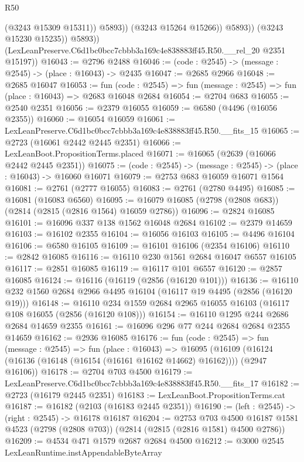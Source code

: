 \begin{lexlean}{R50}
\begin{coremodule}
                        (@3243 @15309 @15311))
                      @5893))
                  (@3243 @15264 @15266))
                @5893))
            (@3243 @15230 @15235))
          @5893))
      (LexLeanPreserve.C6d1bc0bcc7cbbb3a169c4e838883ff45.R50.__rel_20 @2351 @15197))
@16043 := @2796 @2488
@16046 := (code : @2545) -> (message : @2545) -> (place : @16043) -> @2435
@16047 := @2685 @2966
@16048 := @2685 @16047
@16053 := fun (code : @2545) => fun (message : @2545) => fun (place : @16043) => @2683 @16048 @2684
@16054 := @2704 @683
@16055 := @2540 @2351
@16056 := @2379 @16055
@16059 := @6580 (@4496 (@16056 @2355))
@16060 := @16054 @16059
@16061 := LexLeanPreserve.C6d1bc0bcc7cbbb3a169c4e838883ff45.R50.__fits_15
@16065 := @2723 (@16061 @2442 @2445 @2351)
@16066 := LexLeanBoot.PropositionTerms.placed
@16071 := @16065 (@2639 (@16066 @2442 @2445 @2351))
@16075 := (code : @2545) -> (message : @2545) -> (place : @16043) -> @16060 @16071
@16079 := @2753 @683 @16059 @16071 @1564
@16081 := @2761 (@2777 @16055)
@16083 := @2761 (@2780 @4495)
@16085 := @16081 (@16083 @6560)
@16095 := @16079 @16085 (@2798 (@2808 @683)) (@2814 (@2815 (@2816 @1564) @16059 @2786))
@16096 := @2824 @16085
@16101 := @16096 @337 @138 @1562 @16048 @2684
@16102 := @2379 @14659
@16103 := @16102 @2355
@16104 := @16056 @16103
@16105 := @4496 @16104
@16106 := @6580 @16105
@16109 := @16101 @16106 (@2354 @16106)
@16110 := @2842 @16085
@16116 := @16110 @230 @1561 @2684 @16047 @6557 @16105
@16117 := @2851 @16085
@16119 := @16117 @101 @6557
@16120 := @2857 @16085
@16124 := @16116 (@16119 (@2856 (@16120 @101)))
@16136 := @16110 @232 @1560 @2684 @2966 @4495 @16104 (@16117 @19 @4495 (@2856 (@16120 @19)))
@16148 := @16110 @234 @1559 @2684 @2965 @16055 @16103 (@16117 @108 @16055 (@2856 (@16120 @108)))
@16154 := @16110 @1295 @244 @2686 @2684 @14659 @2355
@16161 := @16096 @296 @77 @244 @2684 @2684 @2355 @14659
@16162 := @2936 @16085
@16176 := fun (code : @2545) =>
  fun (message : @2545) =>
  fun (place : @16043) =>
  @16095 (@16109 (@16124 (@16136 (@16148 (@16154 (@16161 @16162 @14662) @16162)))) (@2947 @16106))
@16178 := @2704 @703 @4500
@16179 := LexLeanPreserve.C6d1bc0bcc7cbbb3a169c4e838883ff45.R50.__fits_17
@16182 := @2723 (@16179 @2445 @2351)
@16183 := LexLeanBoot.PropositionTerms.cat
@16187 := @16182 (@2103 (@16183 @2445 @2351))
@16190 := (left : @2545) -> (right : @2545) -> @16178 @16187
@16204 := @2753
    @703
    @4500
    @16187
    @1581
    @4523
    (@2798 (@2808 @703))
    (@2814 (@2815 (@2816 @1581) @4500 @2786))
@16209 := @4534 @471 @1579 @2687 @2684 @4500
@16212 := @3000 @2545 LexLeanRuntime.instAppendableByteArray

\end{coremodule}
\end{lexlean}
